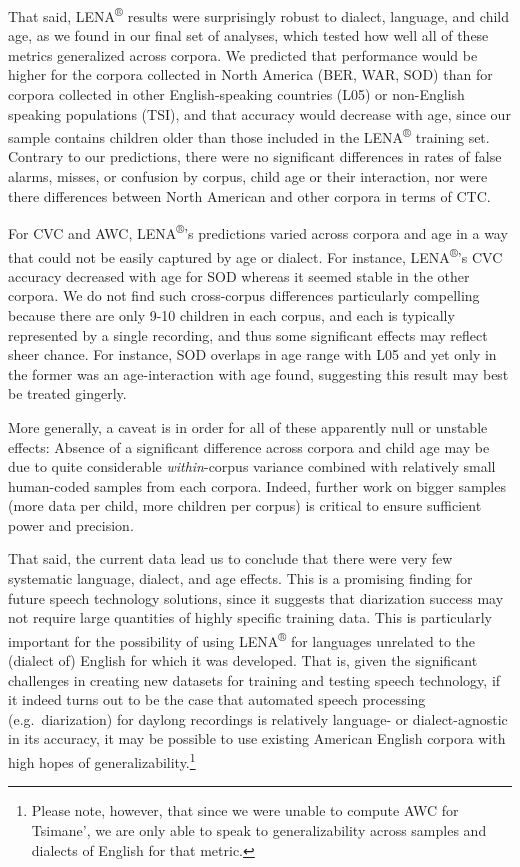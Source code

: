\documentclass[english,floatsintext,man]{apa6}
\begin{document}
That said, LENA\textsuperscript{®} results were surprisingly robust to
dialect, language, and child age, as we found in our final set of
analyses, which tested how well all of these metrics generalized across
corpora. We predicted that performance would be higher for the corpora
collected in North America (BER, WAR, SOD) than for corpora collected in
other English-speaking countries (L05) or non-English speaking
populations (TSI), and that accuracy would decrease with age, since our
sample contains children older than those included in the
LENA\textsuperscript{®} training set. Contrary to our predictions, there
were no significant differences in rates of false alarms, misses, or
confusion by corpus, child age or their interaction, nor were there
differences between North American and other corpora in terms of CTC.

For CVC and AWC, LENA\textsuperscript{®}'s predictions varied across
corpora and age in a way that could not be easily captured by age or
dialect. For instance, LENA\textsuperscript{®}'s CVC accuracy decreased
with age for SOD whereas it seemed stable in the other corpora. We do
not find such cross-corpus differences particularly compelling because
there are only 9-10 children in each corpus, and each is typically
represented by a single recording, and thus some significant effects may
reflect sheer chance. For instance, SOD overlaps in age range with L05
and yet only in the former was an age-interaction with age found,
suggesting this result may best be treated gingerly.

More generally, a caveat is in order for all of these apparently null or
unstable effects: Absence of a significant difference across corpora and
child age may be due to quite considerable \emph{within}-corpus variance
combined with relatively small human-coded samples from each corpora.
Indeed, further work on bigger samples (more data per child, more
children per corpus) is critical to ensure sufficient power and
precision.

That said, the current data lead us to conclude that there were very few
systematic language, dialect, and age effects. This is a promising
finding for future speech technology solutions, since it suggests that
diarization success may not require large quantities of highly specific
training data. This is particularly important for the possibility of
using LENA\textsuperscript{®} for languages unrelated to the (dialect
of) English for which it was developed. That is, given the significant
challenges in creating new datasets for training and testing speech
technology, if it indeed turns out to be the case that automated speech
processing (e.g.~diarization) for daylong recordings is relatively
language- or dialect-agnostic in its accuracy, it may be possible to use
existing American English corpora with high hopes of
generalizability.\footnote{Please note, however, that since we were unable to compute AWC for Tsimane', we are only able to speak to generalizability across samples and dialects of English for that metric.}
\end{document}
